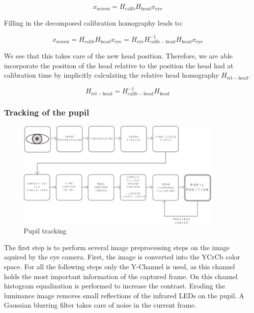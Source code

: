 \begin{equation}
  x_\mathrm{screen} = H_\mathrm{calib}H_\mathrm{head}x_\mathrm{eye} 
\end{equation}

Filling in the decomposed calibration homography leads to:

\begin{equation}
  x_\mathrm{screen} = H_\mathrm{calib}H_\mathrm{head}x_\mathrm{eye} = H_\mathrm{eye} H_\mathrm{calib-head} ^{-1} H_\mathrm{head} x_\mathrm{eye}
\end{equation}

We see that this takes care of the new head position. Therefore, we are able incorporate the position of the head relative to the position the head had at calibration time by implicitly calculating the relative head homography $H_\mathrm{rel-head}$.

\begin{equation}
  H_\mathrm{rel-head} = H_\mathrm{calib-head}^{-1} H_\mathrm{head}
\end{equation}

\subsubsection{Tracking of the pupil}
\begin{figure}[H]
  \centering
  \includegraphics[width=0.9\textwidth]{../finalpres/02c.pdf}
  \caption{Pupil tracking}\label{fig:pupil}
\end{figure}
The first step is to perform several image preprocessing steps on the image aquired by the eye camera. First, the image is converted into the YCrCb color space.
For all the following steps only the Y-Channel is used, as this channel holds the most important information of the captured frame.
On this channel histogram equalization is performed to increase the contrast. 
Eroding the luminance image removes small reflections of the infrared LEDs on the pupil. 
A Gaussian blurring filter takes care of noise in the current frame. 

